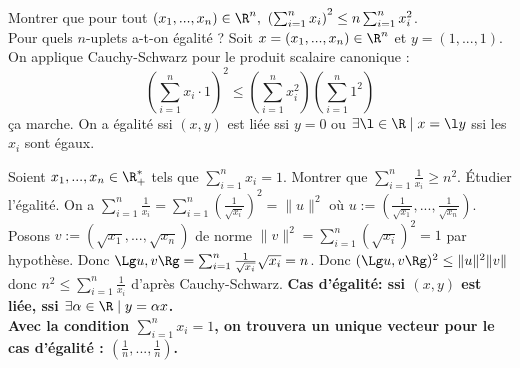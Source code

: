\documentclass[11pt]{article}
\begin{document}
\begin{exercice}{37.6}{}
    Montrer que pour tout $(x_1,...,x_n)\in\R^n,~\left( \sum_{i=1}^nx_i \right)^2\leq n\sum_{i=1}^nx_i^2$.\\
    Pour quels $n$-uplets a-t-on égalité ?
    \tcblower
    Soit $x=(x_1,...,x_n)\in\R^n$ et $y=(1,...,1)$. On applique Cauchy-Schwarz pour le produit scalaire canonique :
    \begin{equation*}
        \left( \sum_{i=1}^nx_i\cdot1 \right)^2 \leq \left(\sum_{i=1}^nx_i^2\right)\left(\sum_{i=1}^n1^2\right)
    \end{equation*}
    ça marche.\n
    On a égalité ssi $(x,y)$ est liée ssi $y=0$ ou $\exists\l\in\R\mid x=\l y$ ssi les $x_i$ sont égaux.
\end{exercice}

\begin{exercice}{37.7}{}
    Soient $x_1,...,x_n\in\R_+^*$ tels que $\sum_{i=1}^nx_i=1$. Montrer que $\sum_{i=1}^n\frac{1}{x_i}\geq n^2$. Étudier l'égalité.
    \tcblower
    On a $\sum_{i=1}^n\frac{1}{x_i}=\sum_{i=1}^n\left( \frac{1}{\sqrt{x_i}} \right)^2=\|u\|^2$ où $u:=(\frac{1}{\sqrt{x_1}},...,\frac{1}{\sqrt{x_n}})$.\n
    Posons $v:=(\sqrt{x_1},...,\sqrt{x_n})$ de norme $\|v\|^2=\sum_{i=1}^n(\sqrt{x_i})^2=1$ par hypothèse.\n
    Donc $\Lg u,v \Rg = \sum_{i=1}^n\frac{1}{\sqrt{x_i}}\sqrt{x_i}=n$.\n
    Donc $(\Lg u,v\Rg)^2\leq\|u\|^2\|v\|$ donc $n^2\leq\sum_{i=1}^n\frac{1}{x_i}$ d'après Cauchy-Schwarz.\n
    \bf{Cas d'égalité:} ssi $(x,y)$ est liée, ssi $\exists \alpha \in \R \mid y = \alpha x$.\\
    Avec la condition $\sum_{i=1}^nx_i=1$, on trouvera un unique vecteur pour le cas d'égalité : $(\frac{1}{n},...,\frac{1}{n})$.
\end{exercice}
\end{document}
